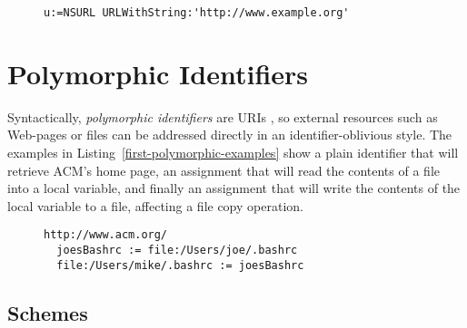 \documentclass[preprint,authoryear]{acm_proc_article-sp}
\begin{document}
\begin{figure}[htbp]
\begin{lstlisting}[style=L,label=url-as-string,caption=URL initialized with a single string.]
u:=NSURL URLWithString:'http://www.example.org'
\end{lstlisting}
\end{figure}


\section{Polymorphic Identifiers}
\label{polymorphic-identifiers}

Syntactically, \emph{polymorphic identifiers} are URIs \cite{rfc3986}, so external resources
such as Web-pages or files can be addressed directly in an identifier-oblivious
style.  The examples in Listing~\ref{first-polymorphic-examples} show a plain
identifier that will retrieve ACM's home page, an assignment that will read
the contents of a file into a local variable, and finally an assignment that will
write the contents of the local variable to a file, affecting a file copy operation.


\begin{figure}[htbp]
\begin{lstlisting}[style=L,label=first-polymorphic-examples,caption=\emph{Polymorphic identifiers} in simple expressions.]
  http://www.acm.org/
  joesBashrc := file:/Users/joe/.bashrc
  file:/Users/mike/.bashrc := joesBashrc
\end{lstlisting}
\end{figure}

\subsection{Schemes}
\end{document}
